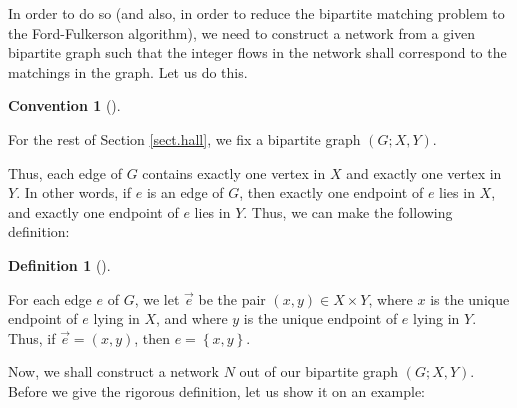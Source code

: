 \documentclass[numbers=enddot,12pt,final,onecolumn,notitlepage]{scrartcl}%
\theoremstyle{definition}
\newtheorem{defi}[theo]{Definition}
\newenvironment{definition}[1][]
{\begin{defi}[#1]\begin{leftbar}}
{\end{leftbar}\end{defi}}
\newtheorem{conv}[theo]{Convention}
\newenvironment{condition}[1][]
{\begin{conv}[#1]\begin{leftbar}}
{\end{leftbar}\end{conv}}
\begin{document}
In order to do so (and also, in order to reduce the bipartite matching problem
to the Ford-Fulkerson algorithm), we need to construct a network from a given
bipartite graph such that the integer flows in the network shall correspond to
the matchings in the graph. Let us do this.

\begin{condition}
For the rest of Section \ref{sect.hall}, we fix a bipartite graph $\left(
G;X,Y\right)  $.
\end{condition}

Thus, each edge of $G$ contains exactly one vertex in $X$ and exactly one
vertex in $Y$. In other words, if $e$ is an edge of $G$, then exactly one
endpoint of $e$ lies in $X$, and exactly one endpoint of $e$ lies in $Y$.
Thus, we can make the following definition:

\begin{definition}
For each edge $e$ of $G$, we let $\overrightarrow{e}$ be the pair $\left(
x,y\right)  \in X\times Y$, where $x$ is the unique endpoint of $e$ lying in
$X$, and where $y$ is the unique endpoint of $e$ lying in $Y$. Thus, if
$\overrightarrow{e}=\left(  x,y\right)  $, then $e=\left\{  x,y\right\}  $.
\end{definition}

Now, we shall construct a network $N$ out of our bipartite graph $\left(
G;X,Y\right)  $. Before we give the rigorous definition, let us show it on an
example:\newpage
\end{document}
